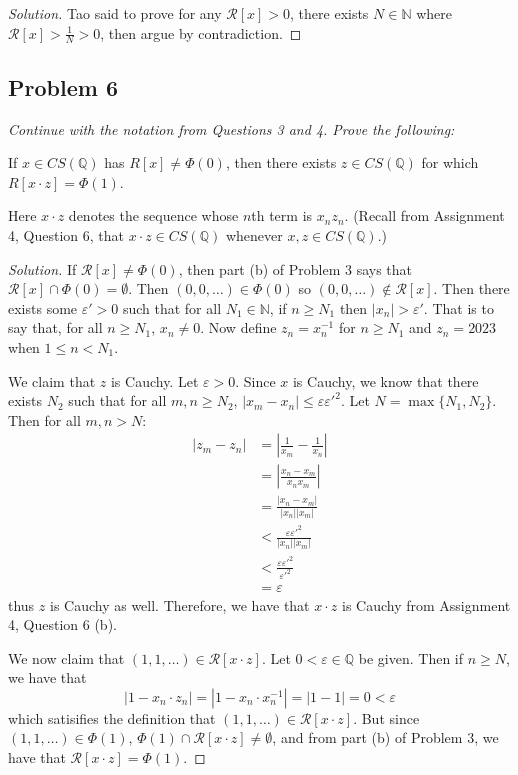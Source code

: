 \documentclass{article}
\newcommand{\N}{{\mathbb N}}
\newcommand{\Q}{{\mathbb Q}}
\newcommand{\ep}{{\varepsilon}}
\newcommand{\SR}{{\mathcal R}}
\begin{document}
\begin{enumerate}
\begin{proof}[Solution]
		Tao said to prove for any $\SR[x] > 0$, there exists $N \in \N$ where
		$\SR[x] > \frac{1}{N} > 0$,
		then argue by contradiction.
	\end{proof} 
\end{enumerate}
\clearpage

\subsection*{Problem 6}
{\it Continue with the notation from Questions 3 and 4. Prove the following:
\begin{center}
	If $x \in CS(\Q)$ has $R[x] \neq \Phi(0)$,
	then there exists $z \in CS(\Q)$ for which $R[x\cdot z] = \Phi(1)$.
\end{center}
Here $x \cdot z$ denotes the sequence whose $n$th term is $x_nz_n$.
(Recall from Assignment 4, Question 6,
that $x\cdot z \in CS(\Q)$ whenever $x,z \in CS(\Q)$.)}

\begin{proof}[Solution]\let\qed\relax
	If $\SR[x] \neq \Phi(0)$,
	then part (b) of Problem 3 says that $\SR[x] \cap \Phi(0) = \emptyset$.
	Then $(0,0,\dots) \in \Phi(0)$ so $(0,0,\dots) \not\in \SR[x]$.
	Then there exists some $\ep' > 0$ such that for all
	$N_1 \in \N$, if $n \geq N_1$ then $|x_n| > \ep'$.
	That is to say that, for all $n\geq N_1$, $x_n \neq 0$.
	Now define $z_n = x_n^{-1}$ for $n \geq N_1$ and $z_n = 2023$
	when $1 \leq n < N_1$.

	We claim that $z$ is Cauchy.
	Let $\ep > 0$.
	Since $x$ is Cauchy,
	we know that there exists $N_2$ such that for all $m,n \geq N_2$,
	$|x_m - x_n| \leq \ep\ep'^2$.
	Let $N = \max\{N_1,N_2\}$.
	Then for all $m,n > N$:
	\begin{align*}
		|z_m - z_n|
		&= \left\lvert\frac{1}{x_m} - \frac{1}{x_n}\right\rvert\\
		&= \left\lvert \frac{x_n - x_m}{x_nx_m} \right\rvert\\
		&= \frac{|x_n-x_m|}{|x_n||x_m|}\\
		&< \frac{\ep\ep'^2}{|x_n||x_m|}\\
		&< \frac{\ep\ep'^2}{\ep'^2}\\
		&= \ep
	\end{align*}
	thus $z$ is Cauchy as well.
	Therefore, we have that $x \cdot z$ is Cauchy from Assignment 4, Question 6 (b).

	We now claim that $(1,1,\dots) \in \SR[x\cdot z]$.
	Let $0 < \ep \in \Q$ be given.
	Then if $n \geq N$,
	we have that
	\[
		|1 - x_n\cdot z_n| = |1 - x_n\cdot x_n^{-1}| = |1-1| = 0 < \ep
	\]
	which satisifies the definition that $(1,1,\dots) \in \SR[x\cdot z]$.
	But since $(1,1,\dots) \in \Phi(1)$,
	$\Phi(1) \cap \SR[x \cdot z] \neq \emptyset$,
	and from part (b) of Problem 3, we have that $\SR[x\cdot z] = \Phi(1)$.
\end{proof}
\clearpage
~\clearpage
\end{document}
